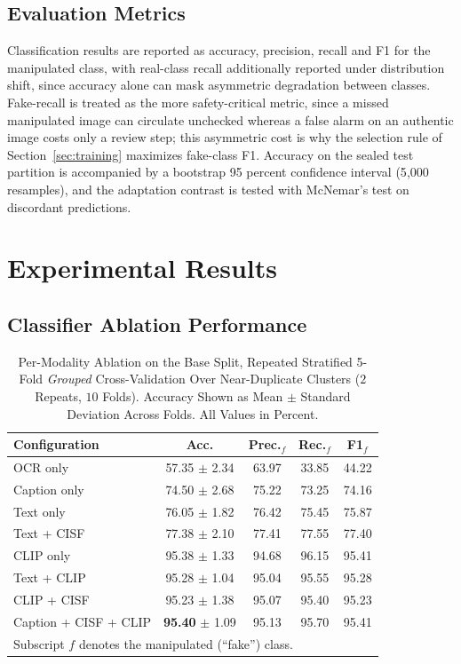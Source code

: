 \documentclass[conference,a4paper]{IEEEtran}
\begin{document}
\subsection{Evaluation Metrics}

Classification results are reported as accuracy, precision, recall and F1 for
the manipulated class, with real-class recall additionally reported under
distribution shift, since accuracy alone can mask asymmetric degradation
between classes. Fake-recall is treated as the more safety-critical metric,
since a missed manipulated image can circulate unchecked whereas a false alarm
on an authentic image costs only a review step; this asymmetric cost is why
the selection rule of Section~\ref{sec:training} maximizes fake-class F1.
Accuracy on the sealed test partition is accompanied by a bootstrap 95 percent
confidence interval (5{,}000 resamples), and the adaptation contrast is tested
with McNemar's test on discordant predictions.

\section{Experimental Results}

\subsection{Classifier Ablation Performance}
\label{sec:ablation}

\begin{table}[!tb]
\caption{Per-Modality Ablation on the Base Split, Repeated Stratified 5-Fold
\emph{Grouped} Cross-Validation Over Near-Duplicate Clusters ($2$ Repeats,
$10$ Folds). Accuracy Shown as Mean $\pm$ Standard Deviation Across Folds.
All Values in Percent.}
\label{tab:ablation}
\centering
\setlength{\tabcolsep}{3.5pt}
\begin{tabular}{lcccc}
\toprule
\textbf{Configuration} & \textbf{Acc.} & \textbf{Prec.$_{f}$} &
\textbf{Rec.$_{f}$} & \textbf{F1$_{f}$} \\
\midrule
OCR only              & 57.35 $\pm$ 2.34 & 63.97 & 33.85 & 44.22 \\
Caption only          & 74.50 $\pm$ 2.68 & 75.22 & 73.25 & 74.16 \\
Text only             & 76.05 $\pm$ 1.82 & 76.42 & 75.45 & 75.87 \\
Text + CISF           & 77.38 $\pm$ 2.10 & 77.41 & 77.55 & 77.40 \\
\midrule
CLIP only             & 95.38 $\pm$ 1.33 & 94.68 & 96.15 & 95.41 \\
Text + CLIP           & 95.28 $\pm$ 1.04 & 95.04 & 95.55 & 95.28 \\
CLIP + CISF           & 95.23 $\pm$ 1.38 & 95.07 & 95.40 & 95.23 \\
Caption + CISF + CLIP & \textbf{95.40} $\pm$ 1.09 & 95.13 & 95.70 & 95.41 \\
\bottomrule
\multicolumn{5}{l}{\footnotesize Subscript $f$ denotes the manipulated
(``fake'') class.}
\end{tabular}
\end{table}
\end{document}
